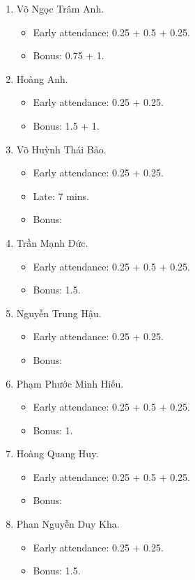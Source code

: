 \documentclass{article}
\begin{document}
\begin{enumerate}
	\item {\sc Võ Ngọc Trâm Anh.}
	\begin{itemize}
		\item Early attendance: 0.25 + 0.5 + 0.25.
		\item Bonus: 0.75 + 1.
	\end{itemize}
	\item {\sc Hoàng Anh.}
	\begin{itemize}
		\item Early attendance: 0.25 + 0.25.
		\item Bonus: 1.5 + 1.
	\end{itemize}
	\item {\sc Võ Huỳnh Thái Bảo.}
	\begin{itemize}
		\item Early attendance: 0.25 + 0.25.
		\item Late: 7 mins.
		\item Bonus: 
	\end{itemize}
	\item {\sc Trần Mạnh Đức.}
	\begin{itemize}
		\item Early attendance: 0.25 + 0.5 + 0.25.
		\item Bonus: 1.5.
	\end{itemize}
	\item {\sc Nguyễn Trung Hậu.}
	\begin{itemize}
		\item Early attendance: 0.25 + 0.25.
		\item Bonus: 
	\end{itemize}
	\item {\sc Phạm Phước Minh Hiếu.}
	\begin{itemize}
		\item Early attendance: 0.25 + 0.5 + 0.25.
		\item Bonus: 1.
	\end{itemize}
	\item {\sc Hoàng Quang Huy.}
	\begin{itemize}
		\item Early attendance: 0.25 + 0.5 + 0.25.
		\item Bonus: 
	\end{itemize}
	\item {\sc Phan Nguyễn Duy Kha.}
	\begin{itemize}
		\item Early attendance: 0.25 + 0.25.
		\item Bonus: 1.5.

\end{itemize}
\end{enumerate}
\end{document}
